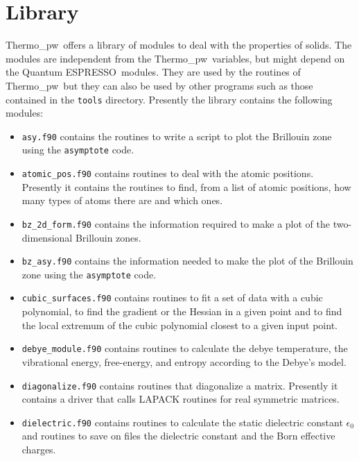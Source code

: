 \documentclass[12pt,a4paper,twoside]{report}
\def\qe{{\sc Quantum ESPRESSO}}
\def\tpw{{\sc Thermo}\_{\sc pw}}
\begin{document}
\newpage
{\color{dark-blue}\chapter{Library}}
\color{black}

\tpw\ offers a library of modules to deal with the properties of solids. The 
modules are independent from the \tpw\ variables, but might
depend on the \qe\ modules. They are used by the routines of \tpw\ 
but they can also be used by other programs such as those contained
in the \texttt{tools} directory. Presently the library contains the
following modules:

\begin{itemize}

\item
\texttt{asy.f90} contains the routines to write a script to plot the
Brillouin zone using the \texttt{asymptote} code.

\item
\texttt{atomic\_pos.f90} contains routines to deal with the atomic positions.
Presently it contains the routines to find, from a list of atomic positions,
how many types of atoms there are and which ones.

\item
\texttt{bz\_2d\_form.f90} contains the information required to make a
plot of the two-dimensional Brillouin zones.

\item
\texttt{bz\_asy.f90} contains the information needed to make the plot       
of the Brillouin zone using the \texttt{asymptote} code.      

\item
\texttt{cubic\_surfaces.f90} contains routines to fit a set of data
with a cubic polynomial, to find the gradient or the Hessian in 
a given point and to find the local extremum of the cubic polynomial
closest to a given input point. 

\item
\texttt{debye\_module.f90} contains routines to calculate the debye 
temperature, the vibrational energy, free-energy, and entropy according
to the Debye's model.

\item
\texttt{diagonalize.f90} contains routines that diagonalize a matrix.
Presently it contains a driver that calls LAPACK routines
for real symmetric matrices.

\item
\texttt{dielectric.f90} contains routines to calculate the static dielectric 
constant $\epsilon_0$ and routines to save on files the dielectric constant
and the Born effective charges.


\end{itemize}
\end{document}
